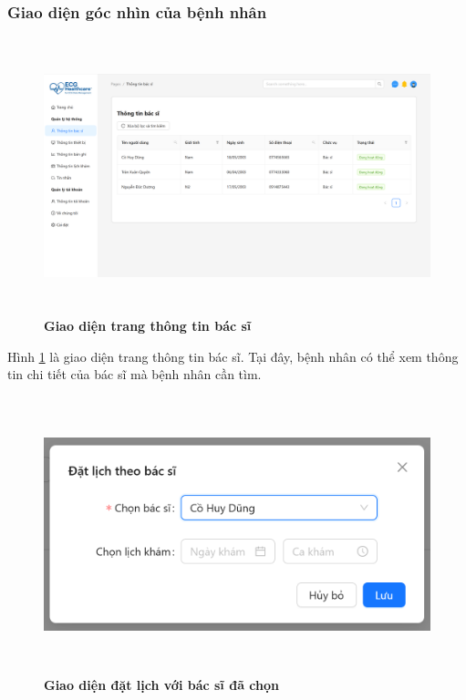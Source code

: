 \subsubsection{Giao diện góc nhìn của bệnh nhân}
\begin{figure}[H]
	\centering
	\includegraphics[width=15cm,height=8cm]{Images/patient_ui/doctor-info.png}
	\caption[Giao diện trang thông tin bác sĩ]{\bfseries \fontsize{12pt}{0pt}\selectfont Giao diện trang thông tin bác sĩ}
	\label{doctor-info-patient}
\end{figure}

Hình \ref{doctor-info-patient} là giao diện trang thông tin bác sĩ. Tại đây, bệnh nhân có thể xem thông tin chi tiết của bác sĩ mà bệnh nhân cần tìm.

\begin{figure}[H]
	\centering
	\includegraphics[width=15cm,height=8cm]{Images/patient_ui/schedule-with-doctor.png}
	\caption[Giao diện đặt lịch với bác sĩ đã chọn]{\bfseries \fontsize{12pt}{0pt}\selectfont Giao diện đặt lịch với bác sĩ đã chọn}
	\label{schedule-with-doctor}
\end{figure}


